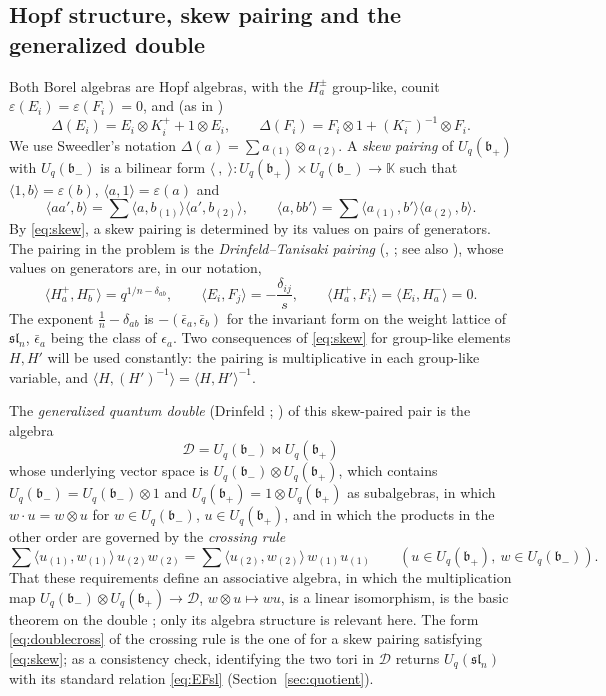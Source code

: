 \documentclass[12pt]{article}
\theoremstyle{remark}
\newcommand{\kk}{\mathbb K}
\newcommand{\U}{U_q}
\newcommand{\slN}{\mathfrak{sl}_n}
\newcommand{\bp}{\mathfrak b_+}
\newcommand{\bm}{\mathfrak b_-}
\newcommand{\ot}{\otimes}
\newcommand{\la}{\langle}
\newcommand{\ra}{\rangle}
\newcommand{\cD}{\mathcal D}
\begin{document}
\subsection{Hopf structure, skew pairing and the generalized double}

Both Borel algebras are Hopf algebras, with the $H^\pm_a$ group-like,
counit $\varepsilon(E_i)=\varepsilon(F_i)=0$, and (as in \cite[Chapter 6]{KS})
\begin{equation}\label{eq:coproduct}
 \Delta(E_i)=E_i\ot K^+_i+1\ot E_i,\qquad
 \Delta(F_i)=F_i\ot1+(K^-_i)^{-1}\ot F_i .
\end{equation}
We use Sweedler's notation $\Delta(a)=\sum a_{(1)}\ot a_{(2)}$. A
\emph{skew pairing} of $\U(\bp)$ with $\U(\bm)$ is a bilinear form
$\la\ ,\ \ra:\U(\bp)\times\U(\bm)\to\kk$ such that
$\la1,b\ra=\varepsilon(b)$, $\la a,1\ra=\varepsilon(a)$ and
\begin{equation}\label{eq:skew}
 \la aa',b\ra=\sum\la a,b_{(1)}\ra\la a',b_{(2)}\ra,\qquad
 \la a,bb'\ra=\sum\la a_{(1)},b'\ra\la a_{(2)},b\ra .
\end{equation}
By \eqref{eq:skew}, a skew pairing is determined by its values on pairs
of generators. The pairing in the problem is the
\emph{Drinfeld--Tanisaki pairing}
(\cite[Section 6.3.1]{KS}, \cite{Ta}; see also \cite[Section 13]{Dr}),
whose values on generators are, in our notation,
\begin{equation}\label{eq:pairing}
 \la H^+_a,H^-_b\ra=q^{1/n-\delta_{ab}},\qquad
 \la E_i,F_j\ra=-\frac{\delta_{ij}}s,\qquad
 \la H^+_a,F_i\ra=\la E_i,H^-_a\ra=0 .
\end{equation}
The exponent $\frac1n-\delta_{ab}$ is $-(\bar\epsilon_a,\bar\epsilon_b)$
for the invariant form on the weight lattice of $\slN$, $\bar\epsilon_a$
being the class of $\epsilon_a$. Two consequences of \eqref{eq:skew} for group-like
elements $H,H'$ will be used constantly: the pairing is multiplicative
in each group-like variable, and $\la H,(H')^{-1}\ra=\la H,H'\ra^{-1}$.

The \emph{generalized quantum double} (Drinfeld \cite[Section 13]{Dr};
\cite[Section 8.2.1]{KS}) of this skew-paired pair is the algebra
\[
 \cD=\U(\bm)\bowtie\U(\bp)
\]
whose underlying vector space is $\U(\bm)\ot\U(\bp)$, which contains
$\U(\bm)=\U(\bm)\ot1$ and $\U(\bp)=1\ot\U(\bp)$ as subalgebras, in which
$w\cdot u=w\ot u$ for $w\in\U(\bm)$, $u\in\U(\bp)$, and in which the
products in the other order are governed by the \emph{crossing rule}
\begin{equation}\label{eq:doublecross}
 \sum\la u_{(1)},w_{(1)}\ra\,u_{(2)}w_{(2)}
 =\sum\la u_{(2)},w_{(2)}\ra\,w_{(1)}u_{(1)}
 \qquad(u\in\U(\bp),\ w\in\U(\bm)).
\end{equation}
That these requirements define an associative algebra, in which the
multiplication map $\U(\bm)\ot\U(\bp)\to\cD$, $w\ot u\mapsto wu$, is a
linear isomorphism, is the basic theorem on the double
\cite[Section 8.2.1]{KS}; only its algebra structure is relevant here.
The form \eqref{eq:doublecross} of the crossing rule is the one of
\cite[Section 8.2.1]{KS} for a skew pairing satisfying \eqref{eq:skew};
as a consistency check, identifying the two tori in $\cD$ returns
$\U(\slN)$ with its standard relation \eqref{eq:EFsl}
(Section~\ref{sec:quotient}).
\end{document}
